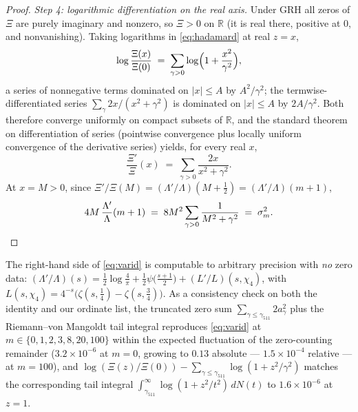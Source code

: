 \begin{proof}
\emph{Step 4: logarithmic differentiation on the real axis.} Under GRH
all zeros of $\Xi$ are purely imaginary and nonzero, so $\Xi>0$ on
$\mathbb R$ (it is real there, positive at $0$, and nonvanishing).
Taking logarithms in \eqref{eq:hadamard} at real $z=x$,
\[
\log\frac{\Xi(x)}{\Xi(0)}\;=\;\sum_{\gamma>0}
\log\Bigl(1+\frac{x^2}{\gamma^2}\Bigr),
\]
a series of nonnegative terms dominated on $|x|\le A$ by
$A^2/\gamma^2$; the termwise-differentiated series
$\sum_\gamma 2x/(x^2+\gamma^2)$ is dominated on $|x|\le A$ by
$2A/\gamma^2$. Both therefore converge uniformly on compact subsets of
$\mathbb R$, and the standard theorem on differentiation of series
(pointwise convergence plus locally uniform convergence of the
derivative series) yields, for every real $x$,
\[
\frac{\Xi'}{\Xi}(x)\;=\;\sum_{\gamma>0}\frac{2x}{x^2+\gamma^2}.
\]
At $x=M>0$, since $\Xi'/\Xi(M)=(\Lambda'/\Lambda)(M+\tfrac12)
=(\Lambda'/\Lambda)(m+1)$,
\[
4M\,\frac{\Lambda'}{\Lambda}(m+1)
\;=\;8M^2\sum_{\gamma>0}\frac1{M^2+\gamma^2}\;=\;\sigma_m^2. \qedhere
\]
\end{proof}

\begin{remark}\label{rem:varid-numerics}
The right-hand side of \eqref{eq:varid} is computable to arbitrary
precision with \emph{no} zero data:
$(\Lambda'/\Lambda)(s)=\tfrac12\log\tfrac4\pi
+\tfrac12\psi\bigl(\tfrac{s+1}2\bigr)+(L'/L)(s,\chi_4)$, with
$L(s,\chi_4)=4^{-s}\bigl(\zeta(s,\tfrac14)-\zeta(s,\tfrac34)\bigr)$.
As a consistency check on both the identity and our ordinate list, the
truncated zero sum $\sum_{\gamma\le\gamma_{511}}2a_\gamma^2$ plus the
Riemann--von Mangoldt tail integral reproduces \eqref{eq:varid} at
$m\in\{0,1,2,3,8,20,100\}$ within the expected fluctuation of the
zero-counting remainder ($3.2\times10^{-6}$ at $m=0$, growing to
$0.13$ absolute --- $1.5\times10^{-4}$ relative --- at $m=100$), and
$\log(\Xi(z)/\Xi(0))-\sum_{\gamma\le\gamma_{511}}\log(1+z^2/\gamma^2)$
matches the corresponding tail integral
$\int_{\gamma_{511}}^\infty\log(1+z^2/t^2)\,dN(t)$ to
$1.6\times10^{-6}$ at $z=1$.
\end{remark}

